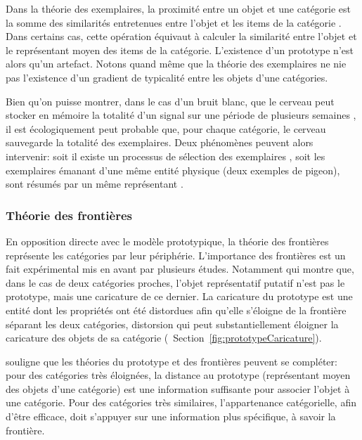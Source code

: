 Dans la théorie des exemplaires, la proximité entre un objet et une catégorie est la somme des similarités entretenues entre l'objet et les items de la catégorie \citep{nosofsky1986attention}. Dans certains cas, cette opération équivaut à calculer la similarité entre l'objet et le représentant moyen des items de la catégorie. L’existence d'un prototype n'est alors qu'un artefact. Notons quand même que la théorie des exemplaires ne nie pas l'existence d'un gradient de typicalité entre les objets d'une catégories.

Bien qu'on puisse montrer, dans le cas d'un bruit blanc, que le cerveau peut stocker en mémoire la totalité d'un signal sur une période de plusieurs semaines  \citep{agus2010rapid}, il est écologiquement peut probable que, pour chaque catégorie, le cerveau sauvegarde la totalité des exemplaires. Deux phénomènes peuvent alors intervenir: soit il existe un processus de sélection des exemplaires \citep{palmeri1995recognition}, soit les exemplaires émanant d'une même entité physique (deux exemples de pigeon), sont résumés par un même représentant \citep{barsalou1998basing}.

\subsubsection{Théorie des frontières}

En opposition directe avec le modèle prototypique, la théorie des frontières représente les catégories par leur périphérie. L'importance des frontières est un fait expérimental mis en avant par plusieurs études. Notamment \citep{davis2010memory} qui montre que, dans le cas de deux catégories proches, l'objet représentatif putatif n'est pas le prototype, mais une caricature de ce dernier. La caricature du prototype est une entité dont les propriétés ont été distordues afin qu'elle s'éloigne de la frontière séparant les deux catégories, distorsion qui peut substantiellement éloigner la caricature des objets de sa catégorie (\cf~Section~\ref{fig:prototypeCaricature}).

\citep{goldstone2003concepts} souligne que les théories du prototype et des frontières peuvent se compléter: pour des catégories très éloignées, la distance au prototype (représentant moyen des objets d'une catégorie) est une information suffisante pour associer l'objet à une catégorie. Pour des catégories très similaires, l’appartenance catégorielle, afin d'être efficace, doit s'appuyer sur une information plus spécifique, à savoir la frontière.

